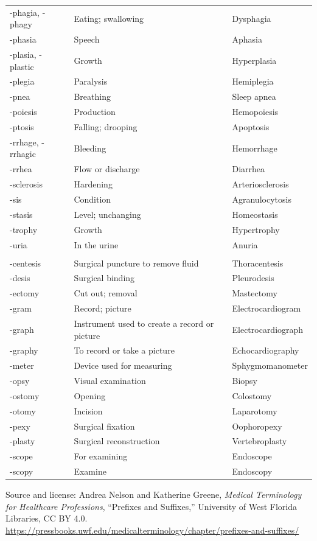 \begin{longtable}{>{\raggedright\arraybackslash}p{} >{\raggedright\arraybackslash}p{} >{\raggedright\arraybackslash}p{}}
-phagia, -phagy & Eating; swallowing & Dysphagia \\
-phasia & Speech & Aphasia \\
-plasia, -plastic & Growth & Hyperplasia \\
-plegia & Paralysis & Hemiplegia \\
-pnea & Breathing & Sleep apnea \\
-poiesis & Production & Hemopoiesis \\
-ptosis & Falling; drooping & Apoptosis \\
-rrhage, -rrhagic & Bleeding & Hemorrhage \\
-rrhea & Flow or discharge & Diarrhea \\
-sclerosis & Hardening & Arteriosclerosis \\
-sis & Condition & Agranulocytosis \\
-stasis & Level; unchanging & Homeostasis \\
-trophy & Growth & Hypertrophy \\
-uria & In the urine & Anuria \\
\midrule
\multicolumn{3}{l}{\textbf{Procedure suffixes}} \\
-centesis & Surgical puncture to remove fluid & Thoracentesis \\
-desis & Surgical binding & Pleurodesis \\
-ectomy & Cut out; removal & Mastectomy \\
-gram & Record; picture & Electrocardiogram \\
-graph & Instrument used to create a record or picture & Electrocardiograph \\
-graphy & To record or take a picture & Echocardiography \\
-meter & Device used for measuring & Sphygmomanometer \\
-opsy & Visual examination & Biopsy \\
-ostomy & Opening & Colostomy \\
-otomy & Incision & Laparotomy \\
-pexy & Surgical fixation & Oophoropexy \\
-plasty & Surgical reconstruction & Vertebroplasty \\
-scope & For examining & Endoscope \\
-scopy & Examine & Endoscopy \\
\bottomrule
\end{longtable}

\noindent Source and license: Andrea Nelson and Katherine Greene, \textit{Medical Terminology for Healthcare Professions}, ``Prefixes and Suffixes,'' University of West Florida Libraries, CC BY 4.0. \url{https://pressbooks.uwf.edu/medicalterminology/chapter/prefixes-and-suffixes/}
